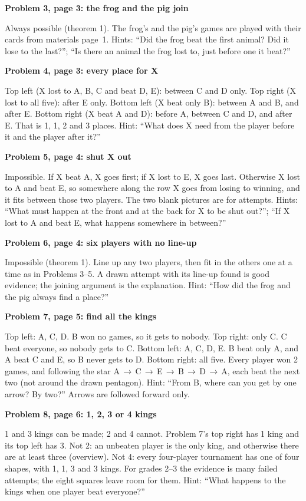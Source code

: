 \documentclass[11pt]{article}
\newcommand{\sub}[1]{\par\needspace{3\baselineskip}\textbf{#1}\par}
\newcommand{\bt}{\,$\to$\,\allowbreak}
\begin{document}
\sub{Problem 3, page 3: the frog and the pig join}
Always possible (theorem 1). The frog's and the pig's games are played with their cards from materials page~1. Hints: ``Did the frog beat the first animal? Did it lose to the last?''; ``Is there an animal the frog lost to, just before one it beat?''

\sub{Problem 4, page 3: every place for X}
Top left (X lost to A, B, C and beat D, E): between C and D only. Top right (X lost to all five): after E only. Bottom left (X beat only B): between A and B, and after E. Bottom right (X beat A and D): before A, between C and D, and after E. That is 1, 1, 2 and 3 places. Hint: ``What does X need from the player before it and the player after it?''

\sub{Problem 5, page 4: shut X out}
Impossible. If X beat A, X goes first; if X lost to E, X goes last. Otherwise X lost to A and beat E, so somewhere along the row X goes from losing to winning, and it fits between those two players. The two blank pictures are for attempts. Hints: ``What must happen at the front and at the back for X to be shut out?''; ``If X lost to A and beat E, what happens somewhere in between?''

\sub{Problem 6, page 4: six players with no line-up}
Impossible (theorem 1). Line up any two players, then fit in the others one at a time as in Problems 3--5. A drawn attempt with its line-up found is good evidence; the joining argument is the explanation. Hint: ``How did the frog and the pig always find a place?''

\sub{Problem 7, page 5: find all the kings}
Top left: A, C, D. B won no games, so it gets to nobody. Top right: only C. C beat everyone, so nobody gets to C. Bottom left: A, C, D, E. B beat only A, and A beat C and E, so B never gets to D. Bottom right: all five. Every player won 2 games, and following the star A\bt C\bt E\bt B\bt D\bt A, each beat the next two (not around the drawn pentagon). Hint: ``From B, where can you get by one arrow? By two?'' Arrows are followed forward only.

\sub{Problem 8, page 6: 1, 2, 3 or 4 kings}
1 and 3 kings can be made; 2 and 4 cannot. Problem 7's top right has 1 king and its top left has 3. Not 2: an unbeaten player is the only king, and otherwise there are at least three (overview). Not 4: every four-player tournament has one of four shapes, with 1, 1, 3 and 3 kings. For grades 2--3 the evidence is many failed attempts; the eight squares leave room for them. Hint: ``What happens to the kings when one player beat everyone?''
\end{document}
